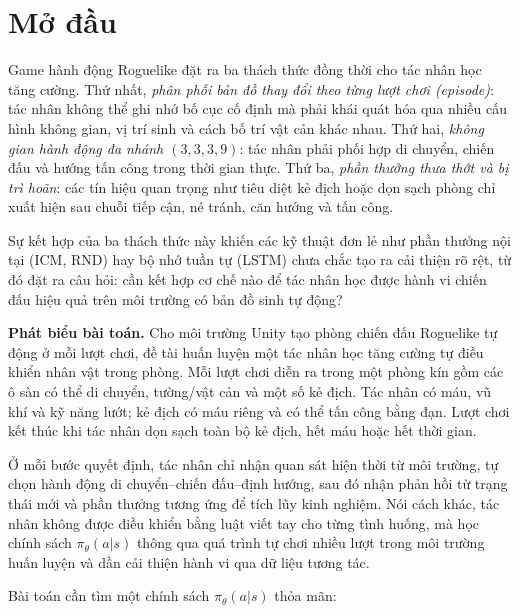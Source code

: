\clearpage
{}

\chapter*{Mở đầu}


Game hành động Roguelike đặt ra ba thách thức đồng thời cho tác nhân học tăng cường. Thứ nhất, \textit{phân phối bản đồ thay đổi theo từng lượt chơi (episode)}: tác nhân không thể ghi nhớ bố cục cố định mà phải khái quát hóa qua nhiều cấu hình không gian, vị trí sinh và cách bố trí vật cản khác nhau. Thứ hai, \textit{không gian hành động đa nhánh $(3,3,3,9)$}: tác nhân phải phối hợp di chuyển, chiến đấu và hướng tấn công trong thời gian thực. Thứ ba, \textit{phần thưởng thưa thớt và bị trì hoãn}: các tín hiệu quan trọng như tiêu diệt kẻ địch hoặc dọn sạch phòng chỉ xuất hiện sau chuỗi tiếp cận, né tránh, căn hướng và tấn công.

Sự kết hợp của ba thách thức này khiến các kỹ thuật đơn lẻ như phần thưởng nội tại (ICM, RND) hay bộ nhớ tuần tự (LSTM) chưa chắc tạo ra cải thiện rõ rệt, từ đó đặt ra câu hỏi: cần kết hợp cơ chế nào để tác nhân học được hành vi chiến đấu hiệu quả trên môi trường có bản đồ sinh tự động?

\vspace{0.3cm}
\noindent\textbf{Phát biểu bài toán.} Cho môi trường Unity tạo phòng chiến đấu Roguelike tự động ở mỗi lượt chơi, đề tài huấn luyện một tác nhân học tăng cường tự điều khiển nhân vật trong phòng. Mỗi lượt chơi diễn ra trong một phòng kín gồm các ô sàn có thể di chuyển, tường/vật cản và một số kẻ địch. Tác nhân có máu, vũ khí và kỹ năng lướt; kẻ địch có máu riêng và có thể tấn công bằng đạn. Lượt chơi kết thúc khi tác nhân dọn sạch toàn bộ kẻ địch, hết máu hoặc hết thời gian.

Ở mỗi bước quyết định, tác nhân chỉ nhận quan sát hiện thời từ môi trường, tự chọn hành động di chuyển--chiến đấu--định hướng, sau đó nhận phản hồi từ trạng thái mới và phần thưởng tương ứng để tích lũy kinh nghiệm. Nói cách khác, tác nhân không được điều khiển bằng luật viết tay cho từng tình huống, mà học chính sách $\pi_\theta(a|s)$ thông qua quá trình tự chơi nhiều lượt trong môi trường huấn luyện và dần cải thiện hành vi qua dữ liệu tương tác.

Bài toán cần tìm một chính sách $\pi_\theta(a|s)$ thỏa mãn:

